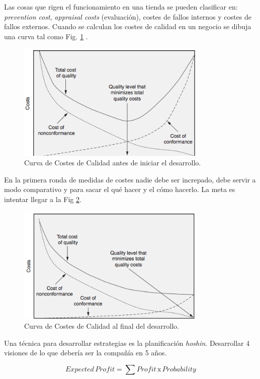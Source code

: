 \documentclass[]{article}
\begin{document}
Las cosas que rigen el funcionamiento en una tienda se pueden clasificar en: \textit{prevention cost}, \textit{appraisal costs} (evaluación), costes de fallos internos y costes de fallos externos. 
Cuando se calculan los costes de calidad en un negocio se dibuja una curva tal como Fig. \ref{fig:CurvaCostesdeCalidadInicio} .
\begin{figure}[ht!]
\centering
\includegraphics[width=90mm]{imagenes/CurvaCostesCalidadInicio.png}
\caption{Curva de Costes de Calidad antes de iniciar el desarrollo.}
\label{fig:CurvaCostesdeCalidadInicio}
\end{figure}

En la primera ronda de medidas de costes nadie debe ser increpado, debe servir a modo comparativo y para sacar el qué hacer y el cómo hacerlo. La meta es intentar llegar a la Fig \ref{fig:CurvaCostesdeCalidadFin}.

\begin{figure}[ht!]
	\centering
	\includegraphics[width=90mm]{imagenes/CurvaCostesCalidadFin.png}
	\caption{Curva de Costes de Calidad al final del desarrollo.}
	\label{fig:CurvaCostesdeCalidadFin}
\end{figure}

Una técnica para desarrollar estrategias es la planificación \textit{hoshin}. Desarrollar 4 visiones de lo que debería ser la compañía en 5 años.

\begin{equation}
Expected \, Profit  = \sum Profit \, \mathrm{x} \, Probability
\end{equation}
\end{document}
